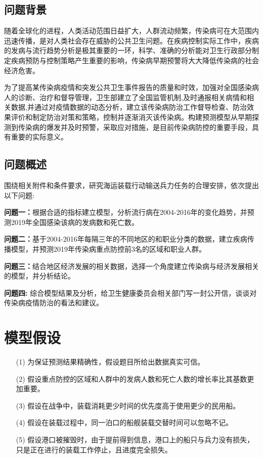 \documentclass{whutmod}
\begin{document}
	\subsection{问题背景}
    随着全球化的进程，人类活动范围日益扩大，人群流动频繁，传染病可在大范围内迅速传播，是对人类社会存在威胁的公共卫生问题。在疾病控制实际工作中，疾病的发病与流行趋势分析是极其重要的一环，科学、准确的分析能对卫生行政部分制定疾病预防与控制策略产生重要的影响，传染病早期预警将大大降低传染病的社会经济危害。
    
    为了提高某传染病疫情和突发公共卫生事件报告的质量和时效，加强对全国感染病人的诊断、治疗和督导管理，卫生部建立了全国监管机制,及时通报相关病情和相关数据,并通过对疫情数据的动态分析，建立该传染病防治工作督导检查、防治效果评价和制定防治对策和策略，控制并逐渐消灭该传染病。构建预测模型从早期探测到传染病的爆发并及时预警，采取应对措施，是目前传染病防控的重要手段，具有重要的实际意义。
    
    

	\subsection{问题概述}
    围绕相关附件和条件要求，研究海运装载行动输送兵力任务的合理安排，依次提出以下问题:
		 
	
	\textbf{问题一：}根据合适的指标建立模型，分析流行病在2004-2016年的变化趋势，并预测2019年全国感染该病的发病数和死亡数。
	
	\textbf{问题二：}基于2004-2016年每隔三年的不同地区的和职业分类的数据，建立疾病传播模型，并预测2019年传染病重点防控前3名的区域和职业人群。
		
	\textbf{问题三：}结合地区经济发展的相关数据，选择一个角度建立传染病与经济发展相关的模型，并分析结论。
	
	\textbf{问题四: }综合模型结果及分析，给卫生健康委员会相关部门写一封公开信，谈谈对传染病疫情防治的看法和建议。
	
	
	\section{模型假设}
	\begin{itemize}                                             
		\item [(1)] 为保证预测结果精确性，假设题目所给出数据真实可信。
		\item [(2)] 假设重点防控的区域和人群中的发病人数和死亡人数的增长率比其基数更加重要。
		\item [(3)] 假设在战争中，装载消耗更少时间的优先度高于使用更少的民用船。
		\item [(4)] 假设在装载过程中，同一泊口的船舰装载交替时间可以忽略不记。
		\item [(5)] 假设港口被摧毁时，由于提前得到信息，港口上的船只与兵力没有损失，只是正在进行的装载工作停止，且进度完全损失。
	\end{itemize}
	
\end{document}
